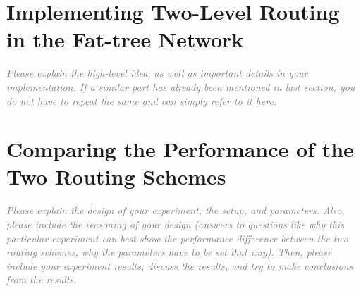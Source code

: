 \documentclass[a4paper,11pt]{article}
\newcommand{\note}[1]{\textit{\textcolor{gray}{#1}}}
\begin{document}
\section{Implementing Two-Level Routing in the Fat-tree Network}

\note{Please explain the high-level idea, as well as important details in your implementation. If a similar part has already been mentioned in last section, you do not have to repeat the same and can simply refer to it here.}

\section{Comparing the Performance of the Two Routing Schemes}

\note{Please explain the design of your experiment, the setup, and parameters. Also, please include the reasoning of your design (answers to questions like why this particular experiment can best show the performance difference between the two routing schemes, why the parameters have to be set that way). Then, please include your experiment results, discuss the results, and try to make conclusions from the results.}
\end{document}
